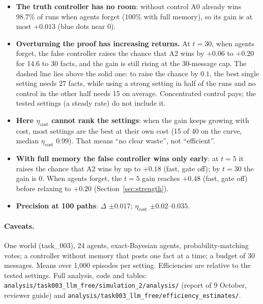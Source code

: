 \documentclass[10pt,a4paper]{article}
\begin{document}
\begin{itemize}\itemsep1pt
\item \textbf{The truth controller has no room}: without control A0 already wins 98.7\% of runs when
  agents forget (100\% with full memory), so its gain is at most $+0.013$ (blue dots near 0).
\item \textbf{Overturning the proof has increasing returns.} At $t = 30$, when agents forget, the
  false controller raises the chance that A2 wins by $+0.06$ to $+0.20$ for 14.6 to 30 facts, and the
  gain is still rising at the 30-message cap. The dashed line lies above the solid one: to raise the
  chance by $0.1$, the best single setting needs 27 facts, while using a strong setting in half of the
  runs and no control in the other half needs 15 on average. Concentrated control pays; the tested
  settings (a steady rate) do not include it.
\item \textbf{Here $\eta_{\text{cost}}$ cannot rank the settings}: when the gain keeps growing with
  cost, most settings are the best at their own cost (15 of 40 on the curve, median
  $\eta_{\text{cost}}$ 0.99). That means ``no clear waste'', not ``efficient''.
\item \textbf{With full memory the false controller wins only early}: at $t = 5$ it raises the chance
  that A2 wins by up to $+0.18$ (fast, gate off); by $t = 30$ the gain is 0. When agents forget, the
  $t = 5$ gain reaches $+0.48$ (fast, gate off) before relaxing to $+0.20$ (Section~\ref{sec:strength}).
\item \textbf{Precision at 100 paths}: $\Delta$ $\pm0.017$; $\eta_{\text{cost}}$ $\pm0.02$--$0.035$.
\end{itemize}

\paragraph{Caveats.} One world (task\_003), 24 agents, exact-Bayesian agents,
probability-matching votes; a controller without memory that posts one fact at a time; a
budget of 30 messages. Means over 1{,}000 episodes per setting. Efficiencies are relative to the
tested settings. Full analysis, code and tables:
\texttt{analysis/task003\_llm\_free/simulation\_2/analysis/} (report of 9 October, reviewer guide)
and \texttt{analysis/task003\_llm\_free/efficiency\_estimates/}.
\end{document}
